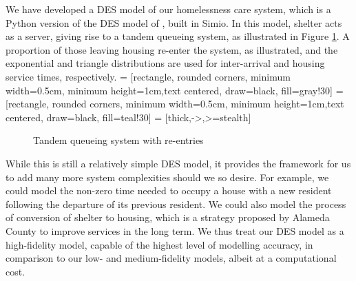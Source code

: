 \documentclass[12pt,a4paper]{article}
\begin{document}
We have developed a DES model of our homelessness care system, which is a Python version of the DES model of \cite{singham2023discrete}, built in Simio. In this model, shelter acts as a server, giving rise to a tandem queueing system, as illustrated in Figure \ref{fig:des-q}. A proportion of those leaving housing re-enter the system, as illustrated, and the exponential and triangle distributions are used for inter-arrival and housing service times, respectively. 
%
 = [rectangle, rounded corners, minimum width=0.5cm, minimum height=1cm,text centered, draw=black, fill=gray!30]
 = [rectangle, rounded corners, minimum width=0.5cm, minimum height=1cm,text centered, draw=black, fill=teal!30]
 = [thick,->,>=stealth]
%
\begin{figure}
  \begin{center}
    \caption{Tandem queueing system with re-entries} \label{fig:des-q}
  \end{center}
\end{figure}

While this is still a relatively simple DES model, it provides the framework for us to add many more system complexities should we so desire. For example, we could model the non-zero time needed to occupy a house with a new resident following the departure of its previous resident. We could also model the process of conversion of shelter to housing, which is a strategy proposed by Alameda County to improve services in the long term. We thus treat our DES model as a high-fidelity model, capable of the highest level of modelling accuracy, in comparison to our low- and medium-fidelity models, albeit at a computational cost.

\newpage
\end{document}
